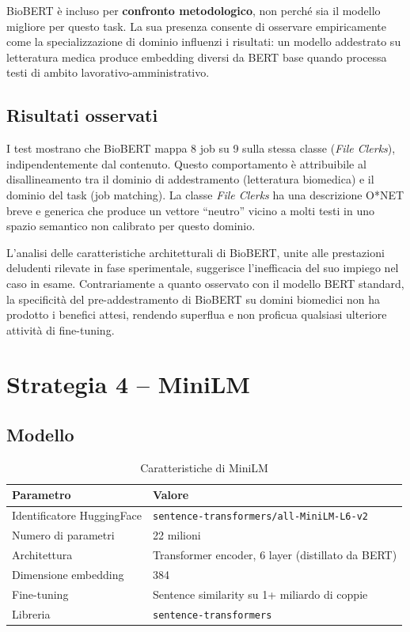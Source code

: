 \documentclass[12pt, a4paper]{report}
\begin{document}
BioBERT è incluso per \textbf{confronto metodologico}, non perché
sia il modello migliore per questo task. La sua presenza consente di
osservare empiricamente come la specializzazione di dominio influenzi
i risultati: un modello addestrato su letteratura medica produce
embedding diversi da BERT base quando processa testi di ambito
lavorativo-amministrativo.

\subsection{Risultati osservati}

I test mostrano che BioBERT mappa 8 job su 9 sulla stessa classe
(\textit{File Clerks}), indipendentemente dal contenuto. Questo
comportamento è attribuibile al disallineamento tra il dominio di
addestramento (letteratura biomedica) e il dominio del task (job
matching). La classe \textit{File Clerks} ha una descrizione O*NET
breve e generica che produce un vettore ``neutro'' vicino a molti
testi in uno spazio semantico non calibrato per questo dominio.
\\
\begin{warnbox}
    L'analisi delle caratteristiche architetturali di BioBERT, unite alle prestazioni deludenti rilevate in fase sperimentale, suggerisce l'inefficacia del suo impiego nel caso in esame. Contrariamente a quanto osservato con il modello BERT standard, la specificità del pre-addestramento di BioBERT su domini biomedici non ha prodotto i benefici attesi, rendendo superflua e non proficua qualsiasi ulteriore attività di fine-tuning.
\end{warnbox}


% 
\section{Strategia 4 -- MiniLM}

\subsection{Modello}

\begin{table}[H]
\centering
\begin{tabular}{ll}
\toprule
\textbf{Parametro} & \textbf{Valore} \\
\midrule
Identificatore HuggingFace & \texttt{sentence-transformers/all-MiniLM-L6-v2} \\
Numero di parametri & 22 milioni \\
Architettura & Transformer encoder, 6 layer (distillato da BERT) \\
Dimensione embedding & 384 \\
Fine-tuning & Sentence similarity su 1+ miliardo di coppie \\
Libreria & \texttt{sentence-transformers} \\
\bottomrule
\end{tabular}
\caption{Caratteristiche di MiniLM}
\end{table}
\end{document}
